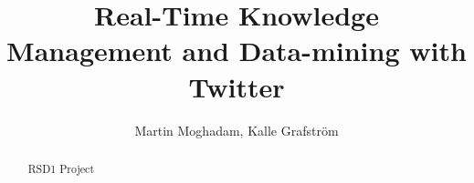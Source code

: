 \documentclass[]{article}  %
\begin{document}
\title{Real-Time Knowledge Management and Data-mining with Twitter}   %
\author{Martin Moghadam, Kalle Grafstr\"{o}m}         %
\maketitle


\begin{abstract}
RSD1 Project
\end{abstract}


\setcounter{page}{1}

\tableofcontents
\newpage

\setcounter{page}{1}


\newpage




\nocite{bib1} 
\nocite{bib2}


\end{document}
